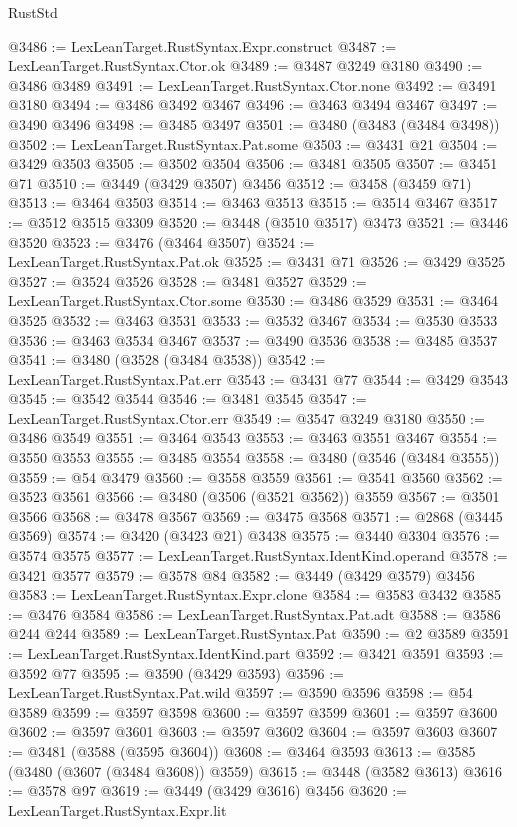 \begin{lexlean}{RustStd}
\begin{coremodule}
{{{{{{{{{{{{{{{{{{{@3486 := LexLeanTarget.RustSyntax.Expr.construct
@3487 := LexLeanTarget.RustSyntax.Ctor.ok
@3489 := @3487 @3249 @3180
@3490 := @3486 @3489
@3491 := LexLeanTarget.RustSyntax.Ctor.none
@3492 := @3491 @3180
@3494 := @3486 @3492 @3467
@3496 := @3463 @3494 @3467
@3497 := @3490 @3496
@3498 := @3485 @3497
@3501 := @3480 (@3483 (@3484 @3498))
@3502 := LexLeanTarget.RustSyntax.Pat.some
@3503 := @3431 @21
@3504 := @3429 @3503
@3505 := @3502 @3504
@3506 := @3481 @3505
@3507 := @3451 @71
@3510 := @3449 (@3429 @3507) @3456
@3512 := @3458 (@3459 @71)
@3513 := @3464 @3503
@3514 := @3463 @3513
@3515 := @3514 @3467
@3517 := @3512 @3515 @3309
@3520 := @3448 (@3510 @3517) @3473
@3521 := @3446 @3520
@3523 := @3476 (@3464 @3507)
@3524 := LexLeanTarget.RustSyntax.Pat.ok
@3525 := @3431 @71
@3526 := @3429 @3525
@3527 := @3524 @3526
@3528 := @3481 @3527
@3529 := LexLeanTarget.RustSyntax.Ctor.some
@3530 := @3486 @3529
@3531 := @3464 @3525
@3532 := @3463 @3531
@3533 := @3532 @3467
@3534 := @3530 @3533
@3536 := @3463 @3534 @3467
@3537 := @3490 @3536
@3538 := @3485 @3537
@3541 := @3480 (@3528 (@3484 @3538))
@3542 := LexLeanTarget.RustSyntax.Pat.err
@3543 := @3431 @77
@3544 := @3429 @3543
@3545 := @3542 @3544
@3546 := @3481 @3545
@3547 := LexLeanTarget.RustSyntax.Ctor.err
@3549 := @3547 @3249 @3180
@3550 := @3486 @3549
@3551 := @3464 @3543
@3553 := @3463 @3551 @3467
@3554 := @3550 @3553
@3555 := @3485 @3554
@3558 := @3480 (@3546 (@3484 @3555))
@3559 := @54 @3479
@3560 := @3558 @3559
@3561 := @3541 @3560
@3562 := @3523 @3561
@3566 := @3480 (@3506 (@3521 @3562)) @3559
@3567 := @3501 @3566
@3568 := @3478 @3567
@3569 := @3475 @3568
@3571 := @2868 (@3445 @3569)
@3574 := @3420 (@3423 @21) @3438
@3575 := @3440 @3304
@3576 := @3574 @3575
@3577 := LexLeanTarget.RustSyntax.IdentKind.operand
@3578 := @3421 @3577
@3579 := @3578 @84
@3582 := @3449 (@3429 @3579) @3456
@3583 := LexLeanTarget.RustSyntax.Expr.clone
@3584 := @3583 @3432
@3585 := @3476 @3584
@3586 := LexLeanTarget.RustSyntax.Pat.adt
@3588 := @3586 @244 @244
@3589 := LexLeanTarget.RustSyntax.Pat
@3590 := @2 @3589
@3591 := LexLeanTarget.RustSyntax.IdentKind.part
@3592 := @3421 @3591
@3593 := @3592 @77
@3595 := @3590 (@3429 @3593)
@3596 := LexLeanTarget.RustSyntax.Pat.wild
@3597 := @3590 @3596
@3598 := @54 @3589
@3599 := @3597 @3598
@3600 := @3597 @3599
@3601 := @3597 @3600
@3602 := @3597 @3601
@3603 := @3597 @3602
@3604 := @3597 @3603
@3607 := @3481 (@3588 (@3595 @3604))
@3608 := @3464 @3593
@3613 := @3585 (@3480 (@3607 (@3484 @3608)) @3559)
@3615 := @3448 (@3582 @3613)
@3616 := @3578 @97
@3619 := @3449 (@3429 @3616) @3456
@3620 := LexLeanTarget.RustSyntax.Expr.lit
}}}}}}}}}}}}}}}}}}}
\end{coremodule}
\end{lexlean}
